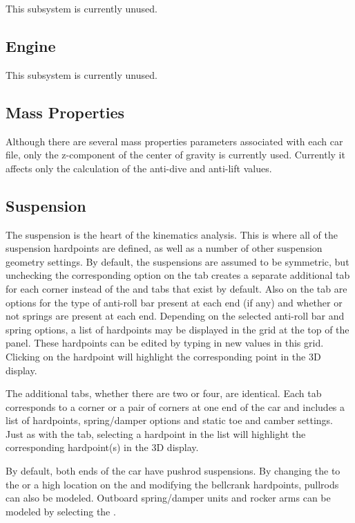 This subsystem is currently unused.

\subsection{Engine} \label{ssec:engine}

This subsystem is currently unused.

\subsection{Mass Properties} \label{ssec:massProperties}

Although there are several mass properties parameters associated with each car file, only the z-component of the center of gravity is currently used.  Currently it affects only the calculation of the anti-dive and anti-lift values.

\subsection{Suspension} \label{ssec:suspension}

The suspension is the heart of the kinematics analysis.  This is where all of the suspension hardpoints are defined, as well as a number of other suspension geometry settings.  By default, the suspensions are assumed to be symmetric, but unchecking the corresponding option on the  tab creates a separate additional tab for each corner instead of the  and  tabs that exist by default.  Also on the  tab are options for the type of anti-roll bar present at each end (if any) and whether or not  springs are present at each end.  Depending on the selected anti-roll bar and  spring options, a list of hardpoints may be displayed in the grid at the top of the panel.  These hardpoints can be edited by typing in new values in this grid.  Clicking on the hardpoint will highlight the corresponding point in the 3D display.

The additional tabs, whether there are two or four, are identical.  Each tab corresponds to a corner or a pair of corners at one end of the car and includes a list of hardpoints, spring/damper options and static toe and camber settings.  Just as with the  tab, selecting a hardpoint in the list will highlight the corresponding hardpoint(s) in the 3D display.

By default, both ends of the car have pushrod suspensions.  By changing the  to the  or a high location on the  and modifying the bellcrank hardpoints, pullrods can also be modeled.  Outboard spring/damper units and rocker arms can be modeled by selecting the  .

